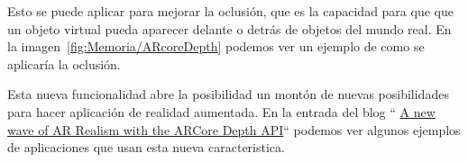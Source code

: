 Esto se puede aplicar para mejorar la oclusión, que es la capacidad para que que un objeto virtual pueda aparecer delante o detrás de objetos del mundo real. En la imagen~\ref{fig:Memoria/ARcoreDepth} podemos ver un ejemplo de como se aplicaría la oclusión.

Esta nueva funcionalidad abre la posibilidad un montón de nuevas posibilidades para hacer aplicación de realidad aumentada. En la entrada del blog `` \href{https://developers.googleblog.com/2020/06/a-new-wave-of-ar-realism-with-arcore-depth-api.html}{A new wave of AR Realism with the ARCore Depth API}`` podemos ver algunos ejemplos de aplicaciones que usan esta nueva caracteristica.


